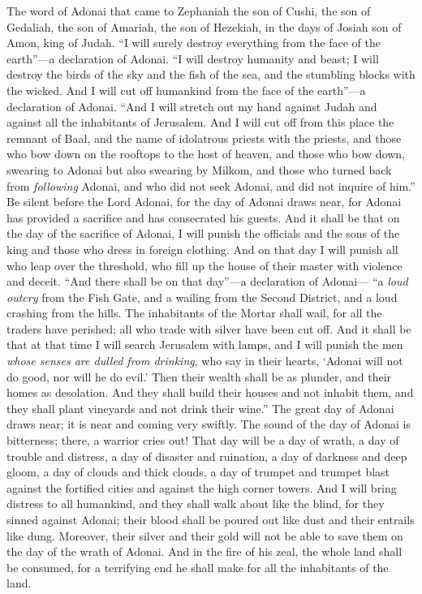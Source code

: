 
\begin{biblechapter} %
 The word of Adonai that came to Zephaniah the son of Cushi, the son of Gedaliah, the son of Amariah, the son of Hezekiah, in the days of Josiah son of Amon, king of Judah.
\verse “I will surely destroy everything 
from the face of the earth”—a declaration of Adonai.
\verse “I will destroy humanity and beast; 
I will destroy the birds of the sky 
and the fish of the sea, 
and the stumbling blocks with the wicked. 
And I will cut off humankind 
from the face of the earth”—a declaration of Adonai.
\verse “And I will stretch out my hand against Judah 
and against all the inhabitants of Jerusalem. 
And I will cut off from this place 
the remnant of Baal, 
and the name of idolatrous priests with the priests,
\verse and those who bow down on the rooftops 
to the host of heaven, 
and those who bow down, swearing to Adonai 
but also swearing by Milkom,
\verse and those who turned back from \textit{following} Adonai, 
and who did not seek Adonai, 
and did not inquire of him.”
\verse Be silent before the Lord Adonai, 
for the day of Adonai draws near, 
for Adonai has provided a sacrifice 
and has consecrated his guests.
\verse And it shall be that on the day of the sacrifice of Adonai, 
I will punish the officials 
and the sons of the king 
and those who dress in foreign clothing.
\verse And on that day I will punish 
all who leap over the threshold, 
who fill up the house of their master 
with violence and deceit.
\verse “And there shall be on that day”—a declaration of Adonai— 
“a \textit{loud outcry} from the Fish Gate, 
and a wailing from the Second District, 
and a loud crashing from the hills.
\verse The inhabitants of the Mortar shall wail, 
for all the traders have perished; 
all who trade with silver have been cut off.
\verse And it shall be that at that time 
I will search Jerusalem with lamps, 
and I will punish the men 
\textit{whose senses are dulled from drinking}, 
who say in their hearts, 
‘Adonai will not do good, nor will he do evil.’
\verse Then their wealth shall be as plunder, 
and their homes as desolation. 
And they shall build their houses and not inhabit them, 
and they shall plant vineyards and not drink their wine.”
\verse The great day of Adonai draws near; 
it is near and coming very swiftly. 
The sound of the day of Adonai is bitterness; 
there, a warrior cries out!
\verse That day will be a day of wrath, 
a day of trouble and distress, 
a day of disaster and ruination, 
a day of darkness and deep gloom, 
a day of clouds and thick clouds,
\verse a day of trumpet and trumpet blast 
against the fortified cities 
and against the high corner towers.
\verse And I will bring distress to all humankind, 
and they shall walk about like the blind, 
for they sinned against Adonai; 
their blood shall be poured out like dust 
and their entrails like dung.
\verse Moreover, their silver and their gold 
will not be able to save them 
on the day of the wrath of Adonai. 
And in the fire of his zeal, 
the whole land shall be consumed, 
for a terrifying end he shall make 
for all the inhabitants of the land.
\end{biblechapter}

